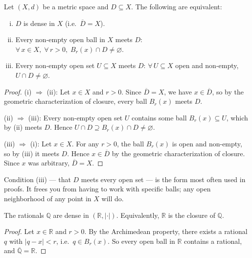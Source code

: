 \begin{proposition}
\label{prop:dense-equiv}
Let $(X,d)$ be a metric space and $D \subseteq X$. The following are equivalent:
\begin{enumerate}[(i)]
  \item $D$ is dense in $X$ (i.e.\ $\overline{D} = X$).
  \item Every non-empty open ball in $X$ meets $D$:
        $\forall\, x \in X,\; \forall\, r > 0,\; B_r(x) \cap D \neq \varnothing$.
  \item Every non-empty open set $U \subseteq X$ meets $D$:
        $\forall\, U \subseteq X$ open and non-empty, $U \cap D \neq \varnothing$.
\end{enumerate}
\end{proposition}

\begin{proof}
(i) $\Rightarrow$ (ii): Let $x \in X$ and $r > 0$.
Since $\overline{D} = X$, we have $x \in \overline{D}$,
so by the geometric characterization of closure,
every ball $B_r(x)$ meets $D$.

(ii) $\Rightarrow$ (iii): Every non-empty open set $U$ contains some ball
$B_r(x) \subseteq U$, which by (ii) meets $D$.
Hence $U \cap D \supseteq B_r(x) \cap D \neq \varnothing$.

(iii) $\Rightarrow$ (i): Let $x \in X$.
For any $r > 0$, the ball $B_r(x)$ is open and non-empty,
so by (iii) it meets $D$.
Hence $x \in \overline{D}$ by the geometric characterization of closure.
Since $x$ was arbitrary, $\overline{D} = X$.
\end{proof}

\begin{remark*}
Condition (iii) --- that $D$ meets every open set --- is the form
most often used in proofs.
It frees you from having to work with specific balls;
any open neighborhood of any point in $X$ will do.
\end{remark*}


\begin{proposition}
\label{prop:Q-dense-R}
The rationals $\mathbb{Q}$ are dense in $(\mathbb{R}, |\cdot|)$.
Equivalently, $\mathbb{R}$ is the closure of $\mathbb{Q}$.
\end{proposition}

\begin{proof}
Let $x \in \mathbb{R}$ and $r > 0$.
By the Archimedean property, there exists a rational $q$ with
$|q - x| < r$, i.e.\ $q \in B_r(x)$.
So every open ball in $\mathbb{R}$ contains a rational, and
$\overline{\mathbb{Q}} = \mathbb{R}$.
\end{proof}

